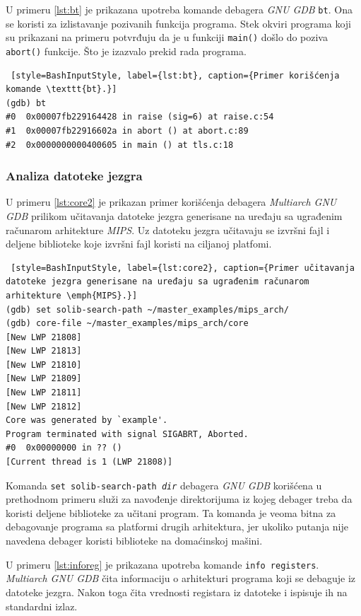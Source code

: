 \documentclass[12pt,oneside]{memoir}
\begin{document}
U primeru \ref{lst:bt} je prikazana upotreba komande debagera \emph{GNU GDB} \texttt{bt}. Ona se koristi za izlistavanje pozivanih funkcija programa. Stek okviri programa koji su prikazani na primeru potvrđuju da je u funkciji \texttt{main()} došlo do poziva \texttt{abort()} funkcije. Što je izazvalo prekid rada programa.

\begin{lstlisting} [style=BashInputStyle, label={lst:bt}, caption={Primer korišćenja komande \texttt{bt}.}]
(gdb) bt
#0  0x00007fb229164428 in raise (sig=6) at raise.c:54
#1  0x00007fb22916602a in abort () at abort.c:89
#2  0x0000000000400605 in main () at tls.c:18
\end{lstlisting}

\subsubsection{Analiza datoteke jezgra}

U primeru \ref{lst:core2} je prikazan primer korišćenja debagera \emph{Multiarch GNU GDB} prilikom učitavanja datoteke jezgra generisane na uređaju sa ugrađenim računarom arhitekture \emph{MIPS}. Uz datoteku jezgra učitavaju se izvršni fajl i deljene biblioteke koje izvršni fajl koristi na ciljanoj platfomi.


\begin{lstlisting} [style=BashInputStyle, label={lst:core2}, caption={Primer učitavanja datoteke jezgra generisane na uređaju sa ugrađenim računarom arhitekture \emph{MIPS}.}]
(gdb) set solib-search-path ~/master_examples/mips_arch/
(gdb) core-file ~/master_examples/mips_arch/core
[New LWP 21808]
[New LWP 21813]
[New LWP 21810]
[New LWP 21809]
[New LWP 21811]
[New LWP 21812]
Core was generated by `example'.
Program terminated with signal SIGABRT, Aborted.
#0  0x00000000 in ?? ()
[Current thread is 1 (LWP 21808)]
\end{lstlisting}

Komanda \texttt{set solib-search-path \emph{dir}} debagera \emph{GNU GDB} korišćena u prethodnom primeru služi za navođenje direktorijuma iz kojeg debager treba da koristi deljene biblioteke za učitani program. Ta komanda je veoma bitna za debagovanje programa sa platformi drugih arhitektura, jer ukoliko putanja nije navedena debager koristi biblioteke na domaćinskoj mašini.

U primeru \ref{lst:inforeg} je prikazana upotreba komande \texttt{info registers}. \emph{Multiarch GNU GDB} čita informaciju o arhitekturi programa koji se debaguje iz datoteke jezgra. Nakon toga čita vrednosti registara iz datoteke i ispisuje ih na standardni izlaz.
\end{document}

